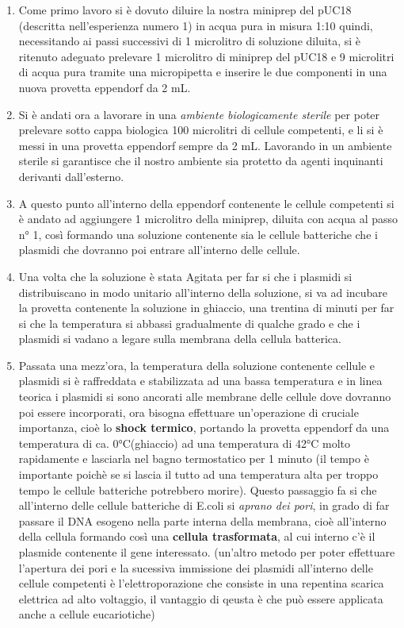 \begin{enumerate}

	\item Come primo lavoro si è dovuto diluire la nostra miniprep del pUC18 (descritta nell'esperienza numero 1) in acqua pura in misura 1:10 quindi, necessitando ai passi successivi di 1 microlitro di soluzione diluita, si è ritenuto adeguato prelevare 1 microlitro  di miniprep del pUC18 e 9 microlitri  di acqua pura tramite una micropipetta e inserire le due componenti in una nuova provetta eppendorf da 2 mL.
	
	
	\item Si è andati ora a lavorare in una \textit{ambiente biologicamente sterile} per poter prelevare sotto cappa biologica 100 microlitri  di cellule competenti, e li si è messi in una provetta eppendorf sempre da 2 mL.  Lavorando in un ambiente sterile si garantisce che il nostro ambiente sia protetto da agenti inquinanti derivanti dall’esterno.
	
	\item A questo punto all'interno della eppendorf contenente le cellule competenti si è andato ad aggiungere 1  microlitro della miniprep, diluita con acqua al passo n° 1, così formando una soluzione contenente sia le cellule batteriche che i plasmidi che dovranno poi entrare all'interno delle cellule. 
	
	\item Una volta che la soluzione è stata Agitata per far si che i plasmidi si distribuiscano in modo unitario all'interno della soluzione, si va ad incubare la provetta contenente la soluzione in ghiaccio, una trentina di minuti per far si che la temperatura si abbassi gradualmente di qualche grado e che i plasmidi si vadano a legare sulla membrana della cellula batterica.
	
	\item Passata una mezz'ora, la temperatura della soluzione contenente cellule e plasmidi si è raffreddata e stabilizzata ad una bassa temperatura e in linea teorica i plasmidi si sono ancorati alle membrane delle cellule dove dovranno poi essere incorporati, ora bisogna effettuare un'operazione di cruciale importanza, cioè lo  \textbf{shock termico}, portando la provetta eppendorf da una temperatura di ca. 0°C(ghiaccio) ad una temperatura di 42°C  molto rapidamente e lasciarla nel bagno termostatico per 1 minuto (il tempo è importante poichè se si lascia il tutto ad una temperatura alta per troppo tempo le cellule batteriche potrebbero morire).  Questo passaggio fa si che all'interno delle cellule batteriche di E.coli si \textit{aprano dei pori}, in grado di far passare il DNA esogeno nella parte interna della membrana, cioè all'interno della cellula formando così una  \textbf{cellula trasformata}, al cui interno c'è il plasmide contenente il gene interessato. 
	(un'altro metodo per poter effettuare l'apertura dei pori e la sucessiva immissione dei plasmidi all'interno delle cellule competenti è l'elettroporazione che consiste in una repentina scarica elettrica ad alto voltaggio, il vantaggio di qeusta è che può essere applicata anche a cellule eucariotiche)
	

\end{enumerate}
